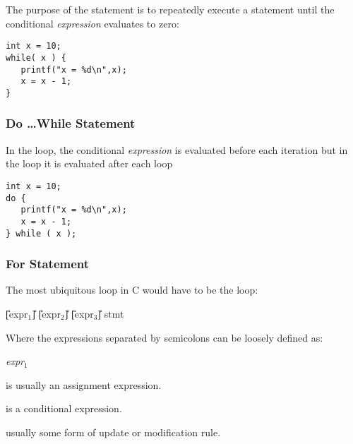 The purpose of the  statement is to repeatedly execute a
statement until the conditional {\it expression} evaluates to zero:

\begin{production}
\begin{verbatim}
int x = 10;
while( x ) {
   printf("x = %d\n",x);
   x = x - 1;
}       
\end{verbatim}
\end{production}

\subsubsection{Do \ldots While Statement}
\label{sec:DoWhileStatement}

In the  loop, the conditional {\it expression} is evaluated
before each iteration but in the  loop it is
evaluated after each loop

\begin{production}
\begin{verbatim}
int x = 10;
do {
   printf("x = %d\n",x);
   x = x - 1;
} while ( x );  
\end{verbatim}
\end{production}

\subsubsection{For Statement}
\label{sec:ForStatement}

The most ubiquitous loop in C would have to be the  loop:
\begin{production}
\bp
{
  \T{(} \U{[}expr$_1$\U{]} \T{;} \U{[}expr$_2$\U{]} \T{;} \U{[}expr$_3$\U{]}\T{;}\T{)} stmt
}
\end{production}

Where the expressions separated by semicolons can be loosely defined
as:

\begin{Ventry2}{{\it expr$_1$}}
\item[{\it expr$_1$}] is usually an assignment expression.
\item[{\it expr$_2$}] is a conditional  expression.
\item[{\it expr$_3$}] usually some form of update or modification rule.
\end{Ventry2}


